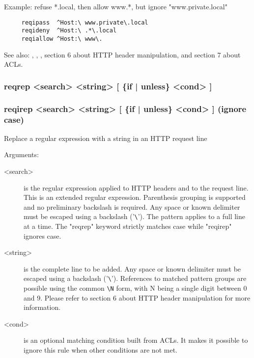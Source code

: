   Example: refuse *.local, then allow www.*, but ignore "www.private.local"
  \begin{verbatim}
     reqipass  ^Host:\ www.private\.local
     reqideny  ^Host:\ .*\.local
     reqiallow ^Host:\ www\.
  \end{verbatim}

  See also: , , , section 6 about HTTP header
            manipulation, and section 7 about ACLs.

\subsubsection[reqrep]{reqrep <search> <string> [ \{if | unless\} <cond> ]}
\subsubsection[reqirep]{reqirep <search> <string> [ \{if | unless\} <cond> ] (ignore case)}


  Replace a regular expression with a string in an HTTP request line

 
  Arguments:
  \begin{description}
  \item[<search>] is the regular expression applied to HTTP headers and to the
              request line. This is an extended regular expression. Parenthesis
              grouping is supported and no preliminary backslash is required.
              Any space or known delimiter must be escaped using a backslash
              ('\verb|\|'). The pattern applies to a full line at a time. The "reqrep"
              keyword strictly matches case while "reqirep" ignores case.

  \item[<string>] is the complete line to be added. Any space or known delimiter
              must be escaped using a backslash ('\verb|\|'). References to matched
              pattern groups are possible using the common \verb|\N| form, with N
              being a single digit between 0 and 9. Please refer to section
              6 about HTTP header manipulation for more information.

  \item[<cond>] is an optional matching condition built from ACLs. It makes it
              possible to ignore this rule when other conditions are not met.
  \end{description}

